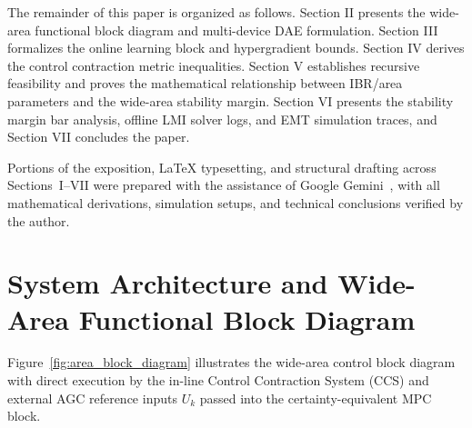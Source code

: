 \documentclass[journal]{IEEEtran}
\begin{document}
The remainder of this paper is organized as follows. Section II presents the wide-area functional block diagram and multi-device DAE formulation. Section III formalizes the online learning block and hypergradient bounds. Section IV derives the control contraction metric inequalities. Section V establishes recursive feasibility and proves the mathematical relationship between IBR/area parameters and the wide-area stability margin. Section VI presents the stability margin bar analysis, offline LMI solver logs, and EMT simulation traces, and Section VII concludes the paper.

Portions of the exposition, LaTeX typesetting, and structural drafting across Sections~I--VII were prepared with the assistance of Google Gemini~\cite{gemini26}, with all mathematical derivations, simulation setups, and technical conclusions verified by the author.

\section{System Architecture and Wide-Area Functional Block Diagram}
Figure~\ref{fig:area_block_diagram} illustrates the wide-area control block diagram with direct execution by the in-line Control Contraction System (CCS) and external AGC reference inputs $U_k$ passed into the certainty-equivalent MPC block.
\end{document}
